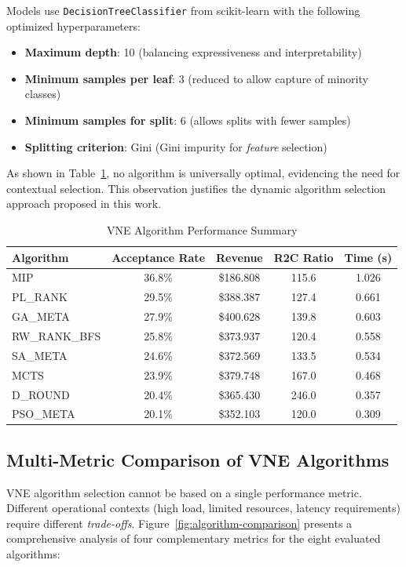 \documentclass[conference]{IEEEtran}
\begin{document}
Models use \texttt{DecisionTreeClassifier} from scikit-learn with the following optimized hyperparameters:

\begin{itemize}
    \item \textbf{Maximum depth}: 10 (balancing expressiveness and interpretability)
    \item \textbf{Minimum samples per leaf}: 3 (reduced to allow capture of minority classes)
    \item \textbf{Minimum samples for split}: 6 (allows splits with fewer samples)
    \item \textbf{Splitting criterion}: Gini (Gini impurity for \textit{feature} selection)
\end{itemize}

As shown in Table~\ref{tab:algorithm-summary}, no algorithm is universally optimal, evidencing the need for contextual selection. This observation justifies the dynamic algorithm selection approach proposed in this work.

\begin{table}[H]
\centering
\caption{VNE Algorithm Performance Summary}
\label{tab:algorithm-summary}
\begin{tabular}{lcccc}
\toprule
\textbf{Algorithm} & \textbf{Acceptance Rate} & \textbf{Revenue} & \textbf{R2C Ratio} & \textbf{Time (s)} \\
\midrule
MIP & 36.8\% & \$186.808 & 115.6 & 1.026 \\
PL\_RANK & 29.5\% & \$388.387 & 127.4 & 0.661 \\
GA\_META & 27.9\% & \$400.628 & 139.8 & 0.603 \\
RW\_RANK\_BFS & 25.8\% & \$373.937 & 120.4 & 0.558 \\
SA\_META & 24.6\% & \$372.569 & 133.5 & 0.534 \\
MCTS & 23.9\% & \$379.748 & 167.0 & 0.468 \\
D\_ROUND & 20.4\% & \$365.430 & 246.0 & 0.357 \\
PSO\_META & 20.1\% & \$352.103 & 120.0 & 0.309 \\
\bottomrule
\end{tabular}
\end{table}

\subsection{Multi-Metric Comparison of VNE Algorithms}

VNE algorithm selection cannot be based on a single performance metric. Different operational contexts (high load, limited resources, latency requirements) require different \textit{trade-offs}. Figure~\ref{fig:algorithm-comparison} presents a comprehensive analysis of four complementary metrics for the eight evaluated algorithms:
\end{document}
